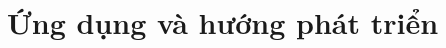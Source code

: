 \documentclass{article}
\begin{document}

\section{Ứng dụng và hướng phát triển}







\end{document}
